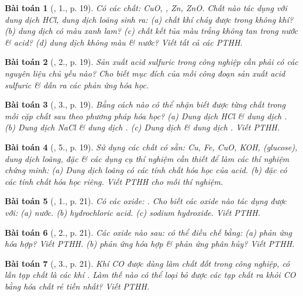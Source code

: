\documentclass{article}
\newtheorem{baitoan}{Bài toán}
\begin{document}
\begin{baitoan}[\cite{SGK_Hoa_Hoc_9}, 1., p. 19]
	Có các chất: {\rm CuO, , Zn, ZnO}. Chất nào tác dụng với dung dịch {\rm HCl}, dung dịch {\rm{}} loãng sinh ra: (a) chất khí cháy được trong không khí? (b) dung dịch có màu xanh lam? (c) chất kết tủa màu trắng không tan trong nước \& acid? (d) dung dịch không màu \& nước? Viết tất cả các {\rm PTHH}.
\end{baitoan}

\begin{baitoan}[\cite{SGK_Hoa_Hoc_9}, 2., p. 19]
	Sản xuất acid sulfuric trong công nghiệp cần phải có các nguyên liệu chủ yếu nào? Cho biết mục đích của mỗi công đoạn sản xuất acid sulfuric \& dẫn ra các phản ứng hóa học.
\end{baitoan}

\begin{baitoan}[\cite{SGK_Hoa_Hoc_9}, 3., p. 19]
	Bằng cách nào có thể nhận biết được từng chất trong mỗi cặp chất sau theo phương pháp hóa học? (a) Dung dịch {\rm HCl} \& dung dịch {\rm{}}. (b) Dung dịch {\rm NaCl} \& dung dịch {\rm{}}. (c) Dung dịch {\rm{}} \& dung dịch {\rm{}}. Viết {\rm PTHH}.
\end{baitoan}

\begin{baitoan}[\cite{SGK_Hoa_Hoc_9}, 5., p. 19]
	Sử dụng các chất có sẵn: {\rm Cu, Fe, CuO, KOH, } (glucose), dung dịch {\rm{}} loãng, {\rm{}} đặc \& các dụng cụ thí nghiệm cần thiết để làm các thí nghiệm chứng minh: (a) Dung dịch {\rm{}} loãng có các tính chất hóa học của acid. (b) {\rm{}} đặc có các tính chất hóa học riêng. Viết PTHH cho mỗi thí nghiệm.
\end{baitoan}

\begin{baitoan}[\cite{SGK_Hoa_Hoc_9}, 1., p. 21]
	Có các oxide: {\rm{}}. Cho biết các oxide nào tác dụng được với: (a) nước. (b) hydrochloric acid. (c) sodium hydroxide. Viết {\rm PTHH}.
\end{baitoan}

\begin{baitoan}[\cite{SGK_Hoa_Hoc_9}, 2., p. 21]
	Các oxide nào sau: {\rm{}} có thể điều chế bằng: (a) phản ứng hóa hợp? Viết PTHH. (b) phản ứng hóa hợp \& phản ứng phân hủy? Viết PTHH.
\end{baitoan}

\begin{baitoan}[\cite{SGK_Hoa_Hoc_9}, 3., p. 21]
	Khí {\rm CO} được dùng làm chất đốt trong công nghiệp, có lẫn tạp chất là các khí {\rm{}}. Làm thế nào có thể loại bỏ được các tạp chất ra khỏi {\rm CO} bằng hóa chất rẻ tiền nhất? Viết {\rm PTHH}.
\end{baitoan}
\end{document}
